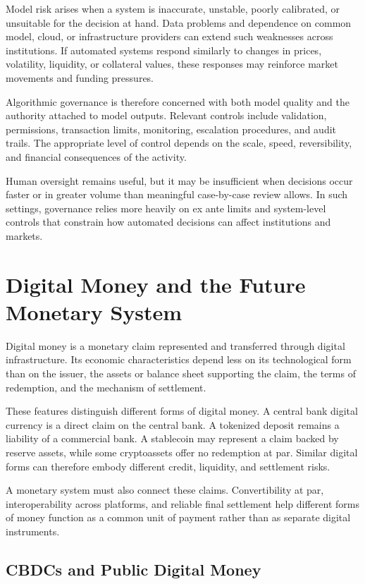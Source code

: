 Model risk arises when a system is inaccurate, unstable, poorly calibrated, or unsuitable for the decision at hand. Data problems and dependence on common model, cloud, or infrastructure providers can extend such weaknesses across institutions. If automated systems respond similarly to changes in prices, volatility, liquidity, or collateral values, these responses may reinforce market movements and funding pressures.

Algorithmic governance is therefore concerned with both model quality and the authority attached to model outputs. Relevant controls include validation, permissions, transaction limits, monitoring, escalation procedures, and audit trails. The appropriate level of control depends on the scale, speed, reversibility, and financial consequences of the activity.

Human oversight remains useful, but it may be insufficient when decisions occur faster or in greater volume than meaningful case-by-case review allows. In such settings, governance relies more heavily on ex ante limits and system-level controls that constrain how automated decisions can affect institutions and markets.



\section{Digital Money and the Future Monetary System}

Digital money is a monetary claim represented and transferred through digital infrastructure. Its economic characteristics depend less on its technological form than on the issuer, the assets or balance sheet supporting the claim, the terms of redemption, and the mechanism of settlement.

These features distinguish different forms of digital money. A central bank digital currency is a direct claim on the central bank. A tokenized deposit remains a liability of a commercial bank. A stablecoin may represent a claim backed by reserve assets, while some cryptoassets offer no redemption at par. Similar digital forms can therefore embody different credit, liquidity, and settlement risks.

A monetary system must also connect these claims. Convertibility at par, interoperability across platforms, and reliable final settlement help different forms of money function as a common unit of payment rather than as separate digital instruments.


\subsection{CBDCs and Public Digital Money}

